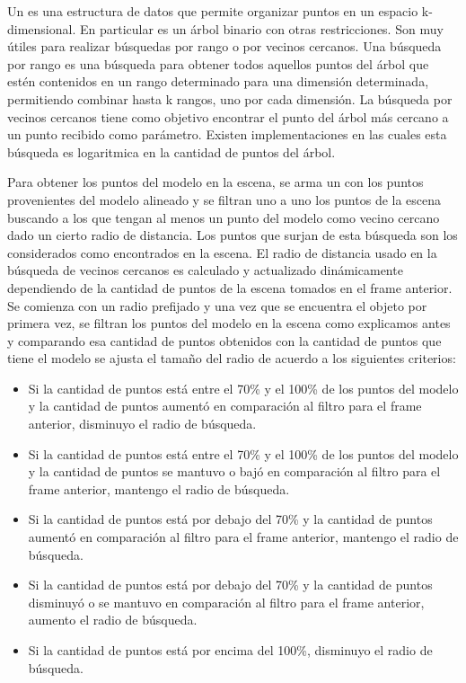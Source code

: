 Un \kdt es una estructura de datos que permite organizar puntos en un espacio k-dimensional. En particular es un árbol binario con otras restricciones. Son muy útiles para realizar búsquedas por rango o por vecinos cercanos. Una búsqueda por rango es una búsqueda para obtener todos aquellos puntos del árbol que estén contenidos en un rango determinado para una dimensión determinada, permitiendo combinar hasta k rangos, uno por cada dimensión. La búsqueda por vecinos cercanos tiene como objetivo encontrar el punto del árbol más cercano a un punto recibido como parámetro. Existen implementaciones en las cuales esta búsqueda es logaritmica en la cantidad de puntos del árbol.

Para obtener los puntos del modelo en la escena, se arma un \kdt con los puntos provenientes del modelo alineado y se filtran uno a uno los puntos de la escena buscando a los que tengan al menos un punto del modelo como vecino cercano dado un cierto radio de distancia. Los puntos que surjan de esta búsqueda son los considerados como encontrados en la escena. El radio de distancia usado en la búsqueda de vecinos cercanos es calculado y actualizado dinámicamente dependiendo de la cantidad de puntos de la escena tomados en el frame anterior. Se comienza con un radio prefijado y una vez que se encuentra el objeto por primera vez, se filtran los puntos del modelo en la escena como explicamos antes y comparando esa cantidad de puntos obtenidos con la cantidad de puntos que tiene el modelo se ajusta el tamaño del radio de acuerdo a los siguientes criterios:
\begin{itemize}
	\item Si la cantidad de puntos está entre el 70\% y el 100\% de los puntos del modelo y la cantidad de puntos aumentó en comparación al filtro para el frame anterior, disminuyo el radio de búsqueda.
	\item Si la cantidad de puntos está entre el 70\% y el 100\% de los puntos del modelo y la cantidad de puntos se mantuvo o bajó en comparación al filtro para el frame anterior, mantengo el radio de búsqueda.
	\item Si la cantidad de puntos está por debajo del 70\% y la cantidad de puntos aumentó en comparación al filtro para el frame anterior, mantengo el radio de búsqueda.
	\item Si la cantidad de puntos está por debajo del 70\% y la cantidad de puntos disminuyó o se mantuvo en comparación al filtro para el frame anterior, aumento el radio de búsqueda.
	\item Si la cantidad de puntos está por encima del 100\%, disminuyo el radio de búsqueda.
\end{itemize}

